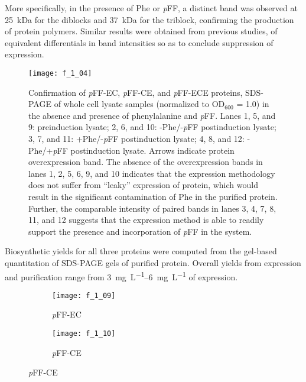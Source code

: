 \begin{refsection}
More specifically, in the presence of Phe or \emph{p}FF, a distinct band was
observed at \SI{25}{\kilo\dalton} for the diblocks and \SI{37}{\kilo\dalton} for
the triblock, confirming the production of protein polymers. Similar results
were obtained from previous studies, of equivalent differentials in band
intensities so as to conclude suppression of expression.
\begin{figure}[h!] \centering \texttt{[image: f\_1\_04]}
    \caption[Confirmation of \emph{p}FF-EC, \emph{p}FF-CE, and \emph{p}FF-ECE
    proteins, SDS-PAGE of whole cell lysate samples] {Confirmation of
        \emph{p}FF-EC, \emph{p}FF-CE, and \emph{p}FF-ECE proteins, SDS-PAGE of
        whole cell lysate samples (normalized to OD{$_{600}$} = 1.0) in the
        absence and presence of phenylalanine and \emph{p}FF. Lanes 1, 5, and 9:
        preinduction lysate; 2, 6, and 10: -Phe/-\emph{p}FF postinduction
        lysate; 3, 7, and 11: +Phe/-\emph{p}FF postinduction lysate; 4, 8, and
        12: -Phe/+\emph{p}FF postinduction lysate. Arrows indicate protein
        overexpression band. The absence of the overexpression bands in lanes 1,
        2, 5, 6, 9, and 10 indicates that the expression methodology does not
        suffer from ``leaky'' expression of protein, which would result in the
        significant contamination of Phe in the purified protein. Further, the
        comparable intensity of paired bands in lanes 3, 4, 7, 8, 11, and 12
        suggests that the expression method is able to readily support the
        presence and incorporation of \emph{p}FF in the system.}
        \label{fig:expression_gel_pFF} \end{figure}
Biosynthetic yields for all three proteins were computed from the gel-based
quantitation of SDS-PAGE gels of purified protein. Overall yields from
expression and purification range from \SIrange{3}{6}{\mg\per\L} of
expression.
\begin{figure}[h!]
    \centering
    \begin{subfigure}[b]{0.3\textwidth}
        \texttt{[image: f\_1\_09]}
        \caption{\emph{p}FF-EC}
        \label{fig:A}
    \end{subfigure}
    \begin{subfigure}[b]{0.3\textwidth}
        \texttt{[image: f\_1\_10]}
        \caption{\emph{p}FF-CE}
        \label{fig:B}
    \end{subfigure}

\end{figure}
\end{refsection}
